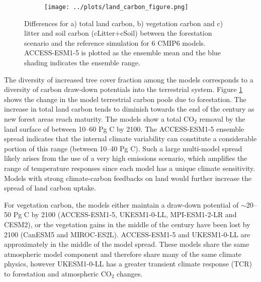 \documentclass[]{article}
\begin{document}
\begin{figure}[H]
    \centering
    \begin{subfigure}[b]{0.6\linewidth}
        \texttt{[image: ../plots/land\_carbon\_figure.png]}
    \end{subfigure}
    \caption{Differences for a) total land carbon, b) vegetation carbon and c) litter and soil carbon (cLitter+cSoil) between the forestation scenario and the reference simulation for 6 CMIP6 models. ACCESS-ESM1-5 is plotted as the ensemble mean and the blue shading indicates the ensemble range.}
    \label{fig:models_cpools}
\end{figure}

The diversity of increased tree cover fraction among the models corresponds to a diversity of carbon draw-down potentials into the terrestrial system.
Figure \ref{fig:models_cpools} shows the change in the model terrestrial carbon pools due to forestation.
The increase in total land carbon tends to diminish towards the end of the century as new forest areas reach maturity.
The models show a total CO$_2$ removal by the land surface of between 10--60 Pg C by 2100.
The ACCESS-ESM1-5 ensemble spread indicates that the internal climate variability can constitute a considerable portion of this range (between 10--40 Pg C).
Such a large multi-model spread likely arises from the use of a very high emissions scenario, which amplifies the range of temperature responses since each model has a unique climate sensitivity.
Models with strong climate-carbon feedbacks on land would further increase the spread of land carbon uptake.

For vegetation carbon, the models either maintain a draw-down potential of $\sim$20--50 Pg C by 2100 (ACCESS-ESM1-5, UKESM1-0-LL, MPI-ESM1-2-LR and CESM2), or the vegetation gains in the middle of the century have been lost by 2100 (CanESM5 and MIROC-ES2L).
ACCESS-ESM1-5 and UKESM1-0-LL are approximately in the middle of the model spread.
These models share the same atmospheric model component and therefore share many of the same climate physics, however UKESM1-0-LL has a greater transient climate response (TCR) to forestation and atmospheric CO$_2$ changes.
\end{document}
